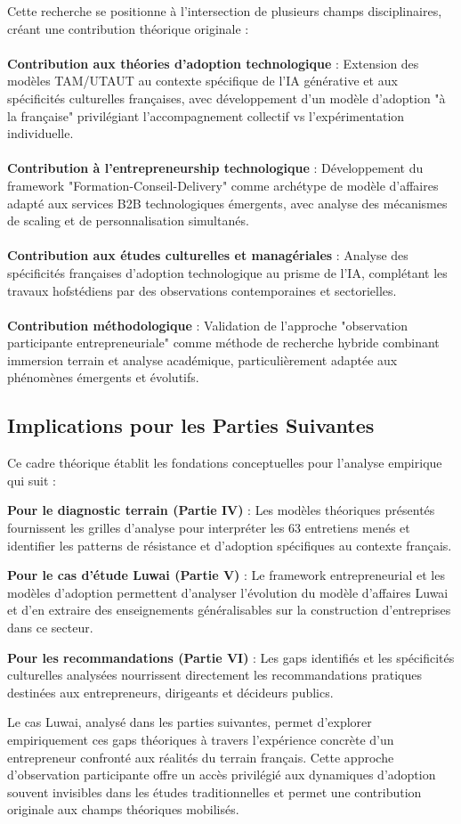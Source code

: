 Cette recherche se positionne à l'intersection de plusieurs champs disciplinaires, créant une contribution théorique originale :
\\\\
\textbf{Contribution aux théories d'adoption technologique} : Extension des modèles TAM/UTAUT au contexte spécifique de l'IA générative et aux spécificités culturelles françaises, avec développement d'un modèle d'adoption "à la française" privilégiant l'accompagnement collectif vs l'expérimentation individuelle.
\\\\
\textbf{Contribution à l'entrepreneurship technologique} : Développement du framework "Formation-Conseil-Delivery" comme archétype de modèle d'affaires adapté aux services B2B technologiques émergents, avec analyse des mécanismes de scaling et de personnalisation simultanés.
\\\\
\textbf{Contribution aux études culturelles et managériales} : Analyse des spécificités françaises d'adoption technologique au prisme de l'IA, complétant les travaux hofstédiens par des observations contemporaines et sectorielles.
\\\\
\textbf{Contribution méthodologique} : Validation de l'approche "observation participante entrepreneuriale" comme méthode de recherche hybride combinant immersion terrain et analyse académique, particulièrement adaptée aux phénomènes émergents et évolutifs.

\subsection{Implications pour les Parties Suivantes}

Ce cadre théorique établit les fondations conceptuelles pour l'analyse empirique qui suit :

\textbf{Pour le diagnostic terrain (Partie IV)} : Les modèles théoriques présentés fournissent les grilles d'analyse pour interpréter les 63 entretiens menés et identifier les patterns de résistance et d'adoption spécifiques au contexte français.

\textbf{Pour le cas d'étude Luwai (Partie V)} : Le framework entrepreneurial et les modèles d'adoption permettent d'analyser l'évolution du modèle d'affaires Luwai et d'en extraire des enseignements généralisables sur la construction d'entreprises dans ce secteur.

\textbf{Pour les recommandations (Partie VI)} : Les gaps identifiés et les spécificités culturelles analysées nourrissent directement les recommandations pratiques destinées aux entrepreneurs, dirigeants et décideurs publics.

Le cas Luwai, analysé dans les parties suivantes, permet d'explorer empiriquement ces gaps théoriques à travers l'expérience concrète d'un entrepreneur confronté aux réalités du terrain français. Cette approche d'observation participante offre un accès privilégié aux dynamiques d'adoption souvent invisibles dans les études traditionnelles et permet une contribution originale aux champs théoriques mobilisés.